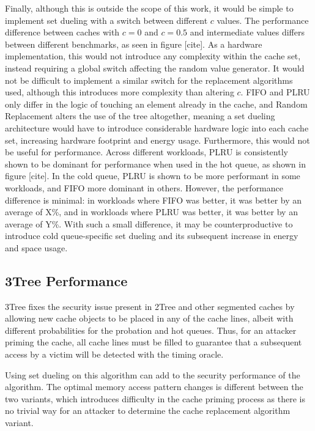 \documentclass[letterpaper]{article}
\begin{document}
Finally, although this is outside the scope of this work,
it would be simple to implement set dueling with a switch between different $c$ values.
The performance difference between caches with $c=0$ and $c=0.5$ and intermediate values
differs between different benchmarks, as seen in figure [cite].%
As a hardware implementation, this would not introduce any complexity within the cache set,
instead requiring a global switch affecting the random value generator.
It would not be difficult to implement a similar switch for the replacement algorithms used,
although this introduces more complexity than altering $c$.
FIFO and PLRU only differ in the logic of touching an element already in the cache,
and Random Replacement alters the use of the tree altogether,
meaning a set dueling architecture would have to introduce considerable hardware logic
into each cache set, increasing hardware footprint and energy usage.
Furthermore, this would not be useful for performance.
Across different workloads,
PLRU is consistently shown to be dominant for performance when used in the hot queue,
as shown in figure [cite].
In the cold queue, PLRU is shown to be more performant in some workloads,
and FIFO more dominant in others.
However, the performance difference is minimal:
in workloads where FIFO was better, it was better by an average of X\%,
and in workloads where PLRU was better, it was better by an average of Y\%.
With such a small difference, it may be counterproductive to introduce cold queue-specific set dueling
and its subsequent increase in energy and space usage.

\subsection{3Tree Performance}


3Tree fixes the security issue present in 2Tree and other segmented caches
by allowing new cache objects to be placed in any of the cache lines,
albeit with different probabilities for the probation and hot queues.
Thus, for an attacker priming the cache, all cache lines must be filled to guarantee
that a subsequent access by a victim will be detected with the timing oracle.

Using set dueling on this algorithm can add to the security performance of the algorithm.
The optimal memory access pattern changes is different between the two variants,
which introduces difficulty in the cache priming process \cite{EvictionSetsAtScale}
as there is no trivial way for an attacker to determine the cache replacement algorithm variant.
\end{document}
